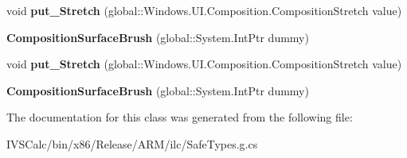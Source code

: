 \begin{DoxyCompactItemize}
void {\bfseries put\+\_\+\+Stretch} (global\+::\+Windows.\+U\+I.\+Composition.\+Composition\+Stretch value)
\item 
\mbox{\label{class_windows_1_1_u_i_1_1_composition_1_1_composition_surface_brush_adde61de5cb5dff361707cd04248ed784}} 
{\bfseries Composition\+Surface\+Brush} (global\+::\+System.\+Int\+Ptr dummy)
\item 
\mbox{\label{class_windows_1_1_u_i_1_1_composition_1_1_composition_surface_brush_a08436b33baca073b40b83f22a2efb8ba}} 
void {\bfseries put\+\_\+\+Stretch} (global\+::\+Windows.\+U\+I.\+Composition.\+Composition\+Stretch value)
\item 
\mbox{\label{class_windows_1_1_u_i_1_1_composition_1_1_composition_surface_brush_adde61de5cb5dff361707cd04248ed784}} 
{\bfseries Composition\+Surface\+Brush} (global\+::\+System.\+Int\+Ptr dummy)
\end{DoxyCompactItemize}


The documentation for this class was generated from the following file\+:\begin{DoxyCompactItemize}
\item 
I\+V\+S\+Calc/bin/x86/\+Release/\+A\+R\+M/ilc/Safe\+Types.\+g.\+cs\end{DoxyCompactItemize}
